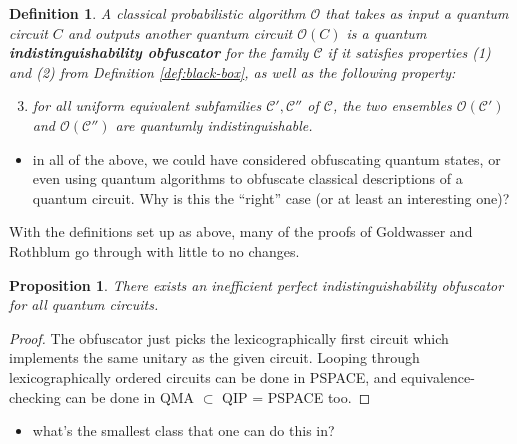 \documentclass[11pt]{article}
\numberwithin{equation}{section}
\newtheorem{proposition}{Proposition}
\newtheorem{definition}{Definition}
\begin{document}
{\begin{definition} A classical probabilistic algorithm $\mathcal O$ that takes as input a quantum circuit $C$ and outputs another quantum circuit $\mathcal O(C)$ is a quantum {\bf indistinguishability obfuscator} for the family $\mathcal C$ if it satisfies properties (1) and (2) from Definition \ref{def:black-box}, as well as the following property:
\begin{enumerate}
\setcounter{enumi}{2}
\item for all uniform equivalent subfamilies $\mathcal C', \mathcal C''$ of $\mathcal C$, the two ensembles $\mathcal O(\mathcal C')$ and $\mathcal O(\mathcal C'')$ are quantumly indistinguishable.
\end{enumerate}
\end{definition}

\begin{itemize}
\item in all of the above, we could have considered obfuscating quantum states, or even using quantum algorithms to obfuscate classical descriptions of a quantum circuit. Why is this the ``right'' case (or at least an interesting one)?
\end{itemize}

With the definitions set up as above, many of the proofs of Goldwasser and Rothblum go through with little to no changes.

\begin{proposition} There exists an inefficient perfect indistinguishability obfuscator for all quantum circuits.
\end{proposition}
\begin{proof}
The obfuscator just picks the lexicographically first circuit which implements the same unitary as the given circuit. Looping through lexicographically ordered circuits can be done in PSPACE, and equivalence-checking can be done in QMA $\subset$ QIP = PSPACE too.
\end{proof}

\begin{itemize}
\item what's the smallest class that one can do this in?
\end{itemize}

}
\end{document}
